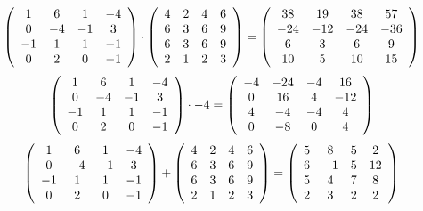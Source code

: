 \documentclass[a4paper,11pt]{article}
\begin{document}
\begin{dmath*}
\left (
\begin{array}{cccc}
1 & 6 & 1 & -4 \cr
0 & -4 & -1 & 3 \cr
-1 & 1 & 1 & -1 \cr
0 & 2 & 0 & -1 \cr
\end{array}
\right )
\cdot
\left (
\begin{array}{cccc}
4 & 2 & 4 & 6 \cr
6 & 3 & 6 & 9 \cr
6 & 3 & 6 & 9 \cr
2 & 1 & 2 & 3 \cr
\end{array}
\right )
=
\left (
\begin{array}{cccc}
38 & 19 & 38 & 57 \cr
-24 & -12 & -24 & -36 \cr
6 & 3 & 6 & 9 \cr
10 & 5 & 10 & 15 \cr
\end{array}
\right )
\end{dmath*}
\begin{dmath*}
\left (
\begin{array}{cccc}
1 & 6 & 1 & -4 \cr
0 & -4 & -1 & 3 \cr
-1 & 1 & 1 & -1 \cr
0 & 2 & 0 & -1 \cr
\end{array}
\right )
\cdot
-4
=
\left (
\begin{array}{cccc}
-4 & -24 & -4 & 16 \cr
0 & 16 & 4 & -12 \cr
4 & -4 & -4 & 4 \cr
0 & -8 & 0 & 4 \cr
\end{array}
\right )
\end{dmath*}
\begin{dmath*}
\left (
\begin{array}{cccc}
1 & 6 & 1 & -4 \cr
0 & -4 & -1 & 3 \cr
-1 & 1 & 1 & -1 \cr
0 & 2 & 0 & -1 \cr
\end{array}
\right )
+
\left (
\begin{array}{cccc}
4 & 2 & 4 & 6 \cr
6 & 3 & 6 & 9 \cr
6 & 3 & 6 & 9 \cr
2 & 1 & 2 & 3 \cr
\end{array}
\right )
=
\left (
\begin{array}{cccc}
5 & 8 & 5 & 2 \cr
6 & -1 & 5 & 12 \cr
5 & 4 & 7 & 8 \cr
2 & 3 & 2 & 2 \cr
\end{array}
\right )
\end{dmath*}
\end{document}

